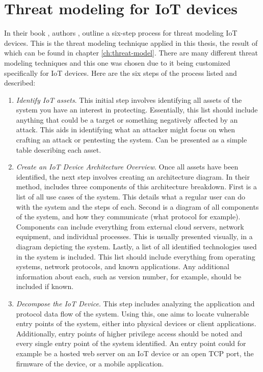 \section{Threat modeling for IoT devices} \label{ch:method:threat-modeling}
In their book , authors \citeauthor{guzman2017iot}, outline a six-step process for threat modeling IoT devices. This is the threat modeling technique applied in this thesis, the result of which can be found in chapter \ref{ch:threat-model}. There are many different threat modeling techniques and this one was chosen due to it being customized specifically for IoT devices. Here are the six steps of the process listed and described:
\begin{enumerate}
    \item \textit{Identify IoT assets}. This initial step involves identifying all assets of the system you have an interest in protecting. Essentially, this list should include anything that could be a target or something negatively affected by an attack. This aids in identifying what an attacker might focus on when crafting an attack or pentesting the system. Can be presented as a simple table describing each asset.
    
    \item \textit{Create an IoT Device Architecture Overview}. Once all assets have been identified, the next step involves creating an architecture diagram. In their method, \citeauthor{guzman2017iot} includes three components of this architecture breakdown. First is a list of all use cases of the system. This details what a regular user can do with the system and the steps of each. Second is a diagram of all components of the system, and how they communicate (what protocol for example). Components can include everything from external cloud servers, network equipment, and individual processes. This is usually presented visually, in a diagram depicting the system. Lastly, a list of all identified technologies used in the system is included. This list should include everything from operating systems, network protocols, and known applications. Any additional information about each, such as version number, for example, should be included if known.
    
    \item \textit{Decompose the IoT Device}. This step includes analyzing the application and protocol data flow of the system. Using this, one aims to locate vulnerable entry points of the system, either into physical devices or client applications. Additionally, entry points of higher privilege access should be noted and every single entry point of the system identified. An entry point could for example be a hosted web server on an IoT device or an open TCP port, the firmware of the device, or a mobile application.
    

\end{enumerate}
